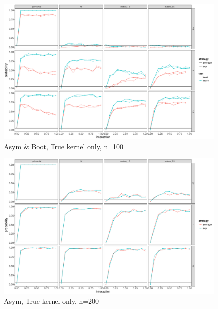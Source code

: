 \documentclass[11pt]{article}
\begin{document}
\begin{figure}
\begin{center}
\includegraphics[width=0.9\columnwidth]{Both} 
\caption{Asym $\&$ Boot, True kernel only, n=100}
\label{fig:res}
\end{center}
\end{figure}

\begin{figure}
\begin{center}
\includegraphics[width=0.9\columnwidth]{Asym_200} 
\caption{Asym, True kernel only, n=200}
\label{fig:res}
\end{center}
\end{figure}



\clearpage



\end{document}
